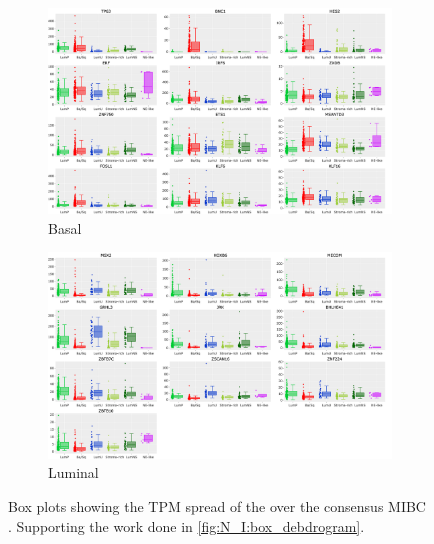 \begin{figure}[!htb]
    \captionsetup[subfigure]{justification=Centering}
  \begin{subfigure}[!t]{0.95\textwidth}
    \includegraphics[width=1.0\textwidth,height=1.0\textheight,keepaspectratio]{Sections/Network_I/Resources/selective_pruning/box_plots/consensus_basal.png}
    \caption{Basal}
    \label{fig:ap:box_basal_consensus}
    \end{subfigure}
  \begin{subfigure}[!t]{0.95\textwidth}
      \includegraphics[width=1.0\textwidth,height=1.0\textheight,keepaspectratio]{Sections/Network_I/Resources/selective_pruning/box_plots/consensus_lum.png}
      \caption{Luminal}
      \label{fig:ap:box_luminal_consensus}
  \end{subfigure}
  \caption[Basal and luminal markers of the consensus subtyping]{Box plots showing the TPM spread of the over the consensus MIBC \citet{Kamoun2020-tj}. Supporting the work done in \cref{fig:N_I:box_debdrogram}.}
  \label{fig:ap:box_consensus}
\end{figure}




